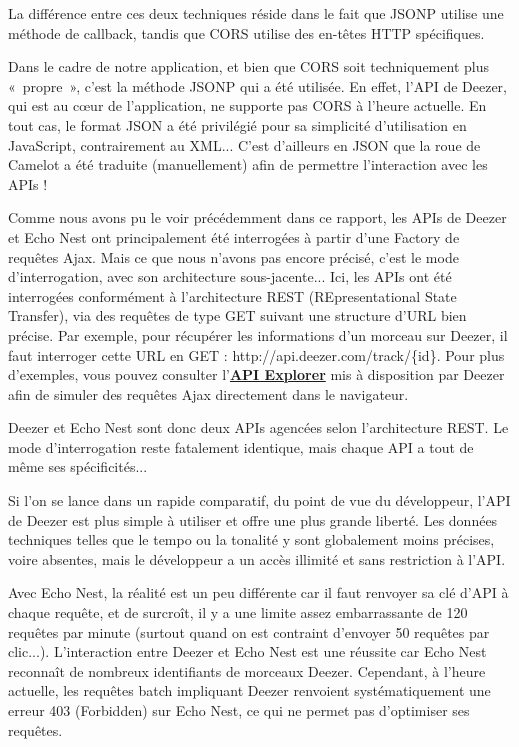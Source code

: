 \documentclass[a4paper,12pt]{article}
\begin{document}
La différence entre ces deux techniques réside dans le fait que JSONP utilise une méthode de callback, tandis que CORS utilise des en-têtes HTTP spécifiques.

Dans le cadre de notre application, et bien que CORS soit techniquement plus «~propre~», c'est la méthode JSONP qui a été utilisée. En effet, l'API de Deezer, qui est au cœur de l'application, ne supporte pas CORS à l'heure actuelle. En tout cas, le format JSON a été privilégié pour sa simplicité d'utilisation en JavaScript, contrairement au XML... C'est d'ailleurs en JSON que la roue de Camelot a été traduite (manuellement) afin de permettre l'interaction avec les APIs !

Comme nous avons pu le voir précédemment dans ce rapport, les APIs de Deezer et Echo Nest ont principalement été interrogées à partir d'une Factory de requêtes Ajax. Mais ce que nous n'avons pas encore précisé, c'est le mode d'interrogation, avec son architecture sous-jacente... Ici, les APIs ont été interrogées conformément à l'architecture REST (REpresentational State Transfer), via des requêtes de type GET suivant une structure d'URL bien précise. Par exemple, pour récupérer les informations d'un morceau sur Deezer, il faut interroger cette URL en GET : http://api.deezer.com/track/\{id\}. Pour plus d'exemples, vous pouvez consulter l'\href{https://developers.deezer.com/api/explorer}{\textbf{API Explorer}} mis à disposition par Deezer afin de simuler des requêtes Ajax directement dans le navigateur.

Deezer et Echo Nest sont donc deux APIs agencées selon l'architecture REST. Le mode d'interrogation reste fatalement identique, mais chaque API a tout de même ses spécificités...

Si l'on se lance dans un rapide comparatif, du point de vue du développeur, l'API de Deezer est plus simple à utiliser et offre une plus grande liberté. Les données techniques telles que le tempo ou la tonalité y sont globalement moins précises, voire absentes, mais le développeur a un accès illimité et sans restriction à l'API.

Avec Echo Nest, la réalité est un peu différente car il faut renvoyer sa clé d'API à chaque requête, et de surcroît, il y a une limite assez embarrassante de 120 requêtes par minute (surtout quand on est contraint d'envoyer 50 requêtes par clic...). L'interaction entre Deezer et Echo Nest est une réussite car Echo Nest reconnaît de nombreux identifiants de morceaux Deezer. Cependant, à l'heure actuelle, les requêtes batch impliquant Deezer renvoient systématiquement une erreur 403 (Forbidden) sur Echo Nest, ce qui ne permet pas d'optimiser ses requêtes.
\end{document}
